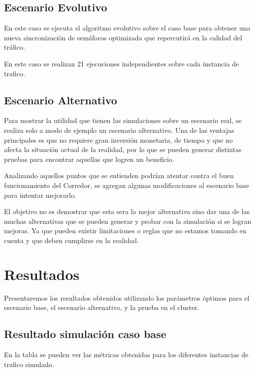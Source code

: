 \subsection{Escenario Evolutivo }
En este caso se ejecuta el algoritmo evolutivo sobre el caso base para obtener una nueva sincronización de semáforos optimizada que repercutirá en la calidad del tráfico.

En este caso se realizan 21 ejecuciones independientes sobre cada instancia de trafico.


\subsection{Escenario Alternativo}

Para mostrar la utilidad que tienen las simulaciones sobre un escenario real, se realiza solo a modo de ejemplo un escenario alternativo. Una de las ventajas principales es que no requiere gran inversión monetaria, de tiempo y que no afecta la situación actual de la realidad, por lo que se pueden generar distintas pruebas para encontrar aquellas que logren un beneficio.

Analizando aquellos puntos que se entienden podrían atentar contra el buen funcionamiento del Corredor, se agregan algunas modificaciones al escenario base para intentar mejorarlo. 

El objetivo no es demostrar que esta sera la mejor alternativa sino dar una de las muchas alternativas que se pueden generar y probar con la simulación si se logran mejoras. Ya que pueden existir limitaciones o reglas que no estamos tomando en cuenta y que deben cumplirse en la realidad.



\section{Resultados}
Presentaremos los resultados obtenidos  utilizando los parámetros óptimos  para el escenario base, el escenario alternativo, y la prueba en el cluster.

\subsection{Resultado simulación caso base}

En la tabla se pueden ver las métricas obtenidas para los diferentes instancias de trafico simulado.
 
